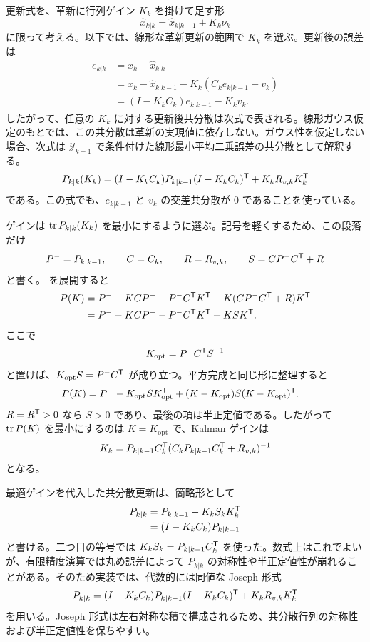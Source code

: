 更新式を、革新に行列ゲイン $K_k$ を掛けて足す形
\begin{equation}
  \hat{x}_{k|k}=\hat{x}_{k|k-1}+K_k\nu_k
  \label{eq:kf-update-mean}
\end{equation}
に限って考える。以下では、線形な革新更新の範囲で $K_k$ を選ぶ。更新後の誤差は
\begin{align}
  e_{k|k}
  &=x_k-\hat{x}_{k|k}\\
  &=x_k-\hat{x}_{k|k-1}-K_k(C_ke_{k|k-1}+v_k)\\
  &=(I-K_kC_k)e_{k|k-1}-K_kv_k.
\end{align}
したがって、任意の $K_k$ に対する更新後共分散は次式で表される。線形ガウス仮定のもとでは、この共分散は革新の実現値に依存しない。ガウス性を仮定しない場合、次式は $\mathcal{Y}_{k-1}$ で条件付けた線形最小平均二乗誤差の共分散として解釈する。
\begin{equation}
  P_{k|k}(K_k)
  =(I-K_kC_k)P_{k|k-1}(I-K_kC_k)^{\mathsf{T}}+K_kR_{v,k}K_k^{\mathsf{T}}
  \label{eq:joseph-form-general}
\end{equation}
である。この式でも、$e_{k|k-1}$ と $v_k$ の交差共分散が 0 であることを使っている。

ゲインは $\operatorname{tr} P_{k|k}(K_k)$ を最小にするように選ぶ。記号を軽くするため、この段落だけ
\begin{equation}
  P^-=P_{k|k-1},
  \qquad C=C_k,
  \qquad R=R_{v,k},
  \qquad S=CP^-C^{\mathsf{T}}+R
\end{equation}
と書く。 を展開すると
\begin{align}
  P(K)
  &=P^- -KCP^- -P^-C^{\mathsf{T}} K^{\mathsf{T}}+K(CP^-C^{\mathsf{T}}+R)K^{\mathsf{T}}\\
  &=P^- -KCP^- -P^-C^{\mathsf{T}} K^{\mathsf{T}}+KSK^{\mathsf{T}}.
\end{align}
ここで
\begin{equation}
  K_\text{opt}=P^-C^{\mathsf{T}} S^{-1}
\end{equation}
と置けば、$K_\text{opt}S=P^-C^{\mathsf{T}}$ が成り立つ。平方完成と同じ形に整理すると
\begin{align}
  P(K)
  &=P^- -K_\text{opt}S K_\text{opt}^{\mathsf{T}}
    +(K-K_\text{opt})S(K-K_\text{opt})^{\mathsf{T}}.
\end{align}
$R=R^{\mathsf{T}}>0$ なら $S>0$ であり、最後の項は半正定値である。したがって $\operatorname{tr} P(K)$ を最小にするのは $K=K_\text{opt}$ で、Kalman ゲインは
\begin{equation}
  K_k=P_{k|k-1}C_k^{\mathsf{T}}
  (C_kP_{k|k-1}C_k^{\mathsf{T}}+R_{v,k})^{-1}
  \label{eq:kf-gain-derived}
\end{equation}
となる。

最適ゲインを代入した共分散更新は、簡略形として
\begin{align}
  P_{k|k}
  &=P_{k|k-1}-K_kS_kK_k^{\mathsf{T}}\\
  &=(I-K_kC_k)P_{k|k-1}
  \label{eq:kf-covariance-simple}
\end{align}
と書ける。二つ目の等号では $K_kS_k=P_{k|k-1}C_k^{\mathsf{T}}$ を使った。数式上はこれでよいが、有限精度演算では丸め誤差によって $P_{k|k}$ の対称性や半正定値性が崩れることがある。そのため実装では、代数的には同値な Joseph 形式
\begin{equation}
  P_{k|k}
  =(I-K_kC_k)P_{k|k-1}(I-K_kC_k)^{\mathsf{T}}+K_kR_{v,k}K_k^{\mathsf{T}}
  \label{eq:kf-joseph-form}
\end{equation}
を用いる。Joseph 形式は左右対称な積で構成されるため、共分散行列の対称性および半正定値性を保ちやすい。


